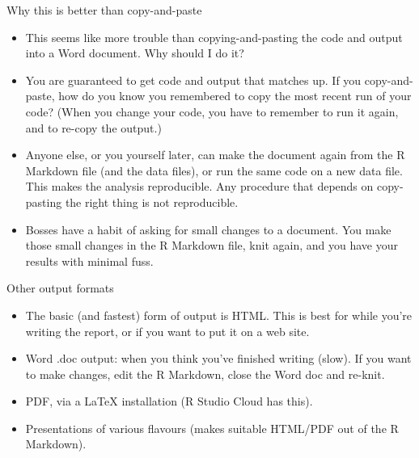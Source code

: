 \documentclass[
  ignorenonframetext,
]{beamer}
\providecommand{\tightlist}{%
  \setlength{\itemsep}{0pt}\setlength{\parskip}{0pt}}
\begin{document}
\begin{frame}{Why this is better than copy-and-paste}
\protect\hypertarget{why-this-is-better-than-copy-and-paste}{}

\begin{itemize}
\tightlist
\item
  This seems like more trouble than copying-and-pasting the code and
  output into a Word document. Why should I do it?
\item
  You are guaranteed to get code and output that matches up. If you
  copy-and-paste, how do you know you remembered to copy the most recent
  run of your code? (When you change your code, you have to remember to
  run it again, and to re-copy the output.)
\item
  Anyone else, or you yourself later, can make the document again from
  the R Markdown file (and the data files), or run the same code on a
  new data file. This makes the analysis reproducible. Any procedure
  that depends on copy-pasting the right thing is not reproducible.
\item
  Bosses have a habit of asking for small changes to a document. You
  make those small changes in the R Markdown file, knit again, and you
  have your results with minimal fuss.
\end{itemize}

\end{frame}

\begin{frame}{Other output formats}
\protect\hypertarget{other-output-formats}{}

\begin{itemize}
\tightlist
\item
  The basic (and fastest) form of output is HTML. This is best for while
  you're writing the report, or if you want to put it on a web site.
\item
  Word .doc output: when you think you've finished writing (slow). If
  you want to make changes, edit the R Markdown, close the Word doc and
  re-knit.
\item
  PDF, via a LaTeX installation (R Studio Cloud has this).
\item
  Presentations of various flavours (makes suitable HTML/PDF out of the
  R Markdown).
\end{itemize}

\end{frame}
\end{document}
